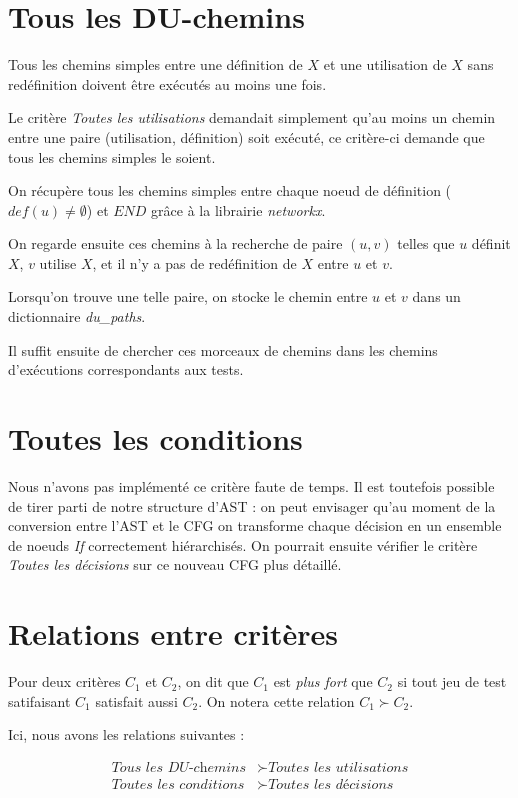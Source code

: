 \section{Tous les DU-chemins}

Tous les chemins simples entre une définition de $X$ et une utilisation de $X$ sans redéfinition doivent être exécutés au moins une fois.

Le critère \textit{Toutes les utilisations} demandait simplement qu'au moins un chemin entre une paire (utilisation, définition) soit exécuté, ce critère-ci demande que tous les chemins simples le soient.

On récupère tous les chemins simples entre chaque noeud de définition ($def(u) \neq \emptyset$) et $END$ grâce à la librairie \textit{networkx}.

On regarde ensuite ces chemins à la recherche de paire $(u, v)$ telles que $u$ définit $X$, $v$ utilise $X$, et il n'y a pas de redéfinition de $X$ entre $u$ et $v$.

Lorsqu'on trouve une telle paire, on stocke le chemin entre $u$ et $v$ dans un dictionnaire \textit{du\_paths}.

Il suffit ensuite de chercher ces morceaux de chemins dans les chemins d'exécutions correspondants aux tests.

\section{Toutes les conditions}

Nous n'avons pas implémenté ce critère faute de temps. Il est toutefois possible de tirer parti de notre structure d'AST : on peut envisager qu'au moment de la conversion entre l'AST et le CFG on transforme chaque décision en un ensemble de noeuds \textit{If} correctement hiérarchisés. On pourrait ensuite vérifier le critère \textit{Toutes les décisions} sur ce nouveau CFG plus détaillé.

\section{Relations entre critères}

Pour deux critères $C_{1}$ et $C_{2}$, on dit que $C_{1}$ est \textit{plus fort} que $C_{2}$ si tout jeu de test satifaisant $C_{1}$ satisfait aussi $C_{2}$. On notera cette relation $C_{1} \succ C_{2}$.

Ici, nous avons les relations suivantes :

\begin{align*}
\textit{Tous les DU-chemins} &\succ \textit{Toutes les utilisations}\\
\textit{Toutes les conditions} &\succ \textit{Toutes les décisions}
\end{align*}